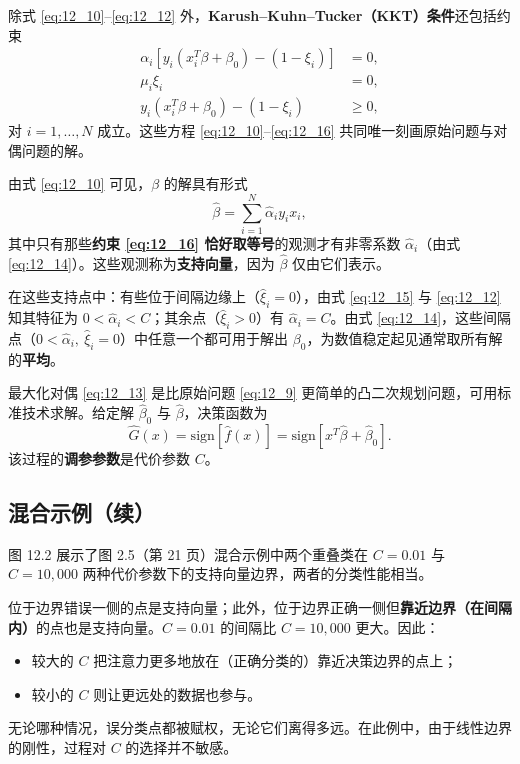 除式 \ref{eq:12_10}--\ref{eq:12_12} 外，\textbf{Karush--Kuhn--Tucker（KKT）条件}还包括约束
\begin{align}
\alpha_i [y_i(x_i^T\beta+\beta_0) - (1-\xi_i)] &= 0, \label{eq:12_14}\\
\mu_i \xi_i &= 0, \label{eq:12_15}\\
y_i(x_i^T\beta+\beta_0) - (1-\xi_i) &\ge 0, \label{eq:12_16}
\end{align}
对 $i=1,\dots,N$ 成立。这些方程 \ref{eq:12_10}--\ref{eq:12_16} 共同唯一刻画原始问题与对偶问题的解。

\begin{remark}[支持向量]
由式 \ref{eq:12_10} 可见，$\beta$ 的解具有形式
\begin{equation}
\hat\beta = \sum_{i=1}^{N}\hat\alpha_i y_i x_i, \label{eq:12_17}
\end{equation}
其中只有那些\textbf{约束 \ref{eq:12_16} 恰好取等号}的观测才有非零系数 $\hat\alpha_i$（由式 \ref{eq:12_14}）。这些观测称为\textbf{支持向量}，因为 $\hat\beta$ 仅由它们表示。

在这些支持点中：有些位于间隔边缘上（$\hat\xi_i=0$），由式 \ref{eq:12_15} 与 \ref{eq:12_12} 知其特征为 $0<\hat\alpha_i<C$；其余点（$\hat\xi_i>0$）有 $\hat\alpha_i=C$。由式 \ref{eq:12_14}，这些间隔点（$0<\hat\alpha_i,\ \hat\xi_i=0$）中任意一个都可用于解出 $\beta_0$，为数值稳定起见通常取所有解的\textbf{平均}。
\end{remark}

最大化对偶 \ref{eq:12_13} 是比原始问题 \ref{eq:12_9} 更简单的凸二次规划问题，可用标准技术求解。给定解 $\hat\beta_0$ 与 $\hat\beta$，决策函数为
\begin{equation}
\hat G(x) = \mathrm{sign}[\hat f(x)] = \mathrm{sign}[x^T\hat\beta + \hat\beta_0]. \label{eq:12_18}
\end{equation}
该过程的\textbf{调参参数}是代价参数 $C$。

\subsection{混合示例（续）}

图 12.2 展示了图 2.5（第 21 页）混合示例中两个重叠类在 $C=0.01$ 与 $C=10{,}000$ 两种代价参数下的支持向量边界，两者的分类性能相当。

\begin{remark}[$C$ 的作用]
位于边界错误一侧的点是支持向量；此外，位于边界正确一侧但\textbf{靠近边界（在间隔内）}的点也是支持向量。$C=0.01$ 的间隔比 $C=10{,}000$ 更大。因此：
\begin{itemize}
\item 较大的 $C$ 把注意力更多地放在（正确分类的）靠近决策边界的点上；
\item 较小的 $C$ 则让更远处的数据也参与。
\end{itemize}
无论哪种情况，误分类点都被赋权，无论它们离得多远。在此例中，由于线性边界的刚性，过程对 $C$ 的选择并不敏感。
\end{remark}

